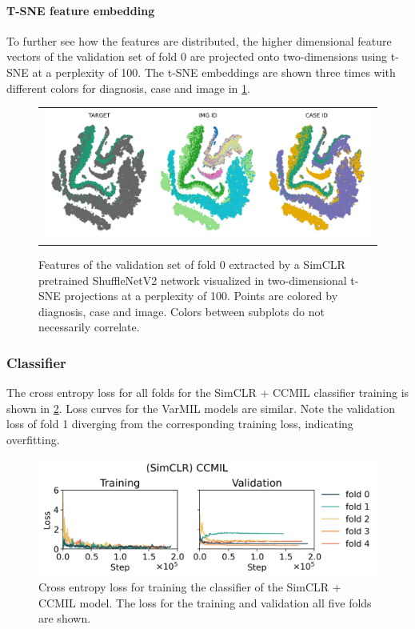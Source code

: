 \paragraph{T-SNE feature embedding}
To further see how the features are distributed, the higher dimensional feature vectors of the validation set of fold 0 are projected onto two-dimensions using t-SNE at a perplexity of 100.
The t-SNE embeddings are shown three times with different colors for diagnosis, case and image in \cref{fig:tsne-features}.

\begin{figure}
    \centering
    \begin{tabular}[\linewidth]{c}
    \includegraphics[width=\linewidth]{pediatric-brain-tumours/images/tsne-features.pdf}
    \end{tabular}
    \caption[T-SNE projections of features]{
        Features of the validation set of fold 0 extracted by a SimCLR pretrained ShuffleNetV2 network visualized in two-dimensional t-SNE projections at a perplexity of 100.
        Points are colored by diagnosis, case and image.
        Colors between subplots do not necessarily correlate.
    }
    \label{fig:tsne-features}
\end{figure}

\subsubsection{Classifier}

The cross entropy loss for all folds for the SimCLR + CCMIL classifier training is shown in \cref{fig:simclr-ccmil-loss}.
Loss curves for the VarMIL models are similar.
Note the validation loss of fold 1 diverging from the corresponding training loss, indicating overfitting.

\begin{figure}
    \centering
    \includegraphics[width=\linewidth]{pediatric-brain-tumours/images/simclr+ccmil-loss.png}
    \caption[Training loss CCMIL]{
        Cross entropy loss for training the classifier of the SimCLR + CCMIL model.
        The loss for the training and validation all five folds are shown.
    }
    \label{fig:simclr-ccmil-loss}
\end{figure}

